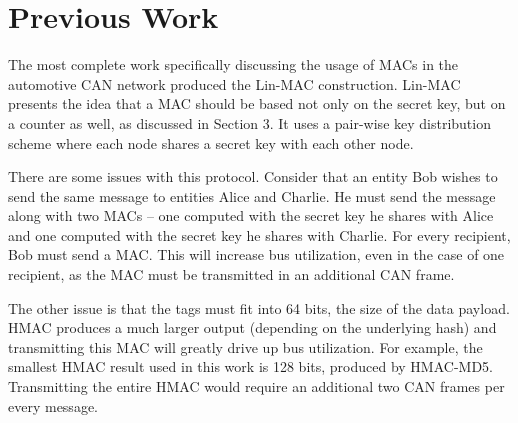 \section{Previous Work}
The most complete work specifically discussing the usage of MACs in the automotive CAN network produced the Lin-MAC construction\cite{Lin-MAC}. Lin-MAC presents the idea that a MAC should be based not only on the secret key, but on a counter as well, as discussed in Section 3. It uses a pair-wise key distribution scheme where each node shares a secret key with each other node.


There are some issues with this protocol. Consider that an entity Bob wishes to send the same message to entities Alice and Charlie. He must send the message along with two MACs -- one computed with the secret key he shares with Alice and one computed with the secret key he shares with Charlie. For every recipient, Bob must send a MAC. This will increase bus utilization, even in the case of one recipient, as the MAC must be transmitted in an additional CAN frame.

The other issue is that the tags must fit into 64 bits, the size of the data payload. HMAC produces a much larger output (depending on the underlying hash) and transmitting this MAC will greatly drive up bus utilization. For example, the smallest HMAC result used in this work is 128 bits, produced by HMAC-MD5. Transmitting the entire HMAC would require an additional two CAN frames per every message.


